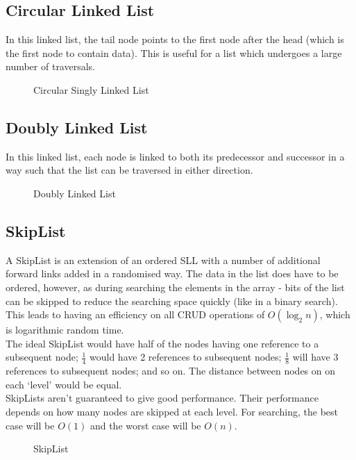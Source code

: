\subsection{Circular Linked List}
In this linked list, the tail node points to the first node after the head (which is the first node to contain data). This is useful for a list which undergoes a large number of traversals.
\begin{figure}[H]
    \centering
    
    \caption{Circular Singly Linked List}
\end{figure}

\subsection{Doubly Linked List}
In this linked list, each node is linked to both its predecessor and successor in a way such that the list can be traversed in either direction.
\begin{figure}[H]
    \centering
    
    \caption{Doubly Linked List}
\end{figure}

\subsection{SkipList}
A SkipList is an extension of an ordered SLL with a number of additional forward links added in a randomised way. The data in the list does have to be ordered, however, as during searching the elements in the array - bits of the list can be skipped to reduce the searching space quickly (like in a binary search). This leads to having an efficiency on all CRUD operations of $O(\log_2n)$, which is logarithmic random time.\\

The ideal SkipList would have half of the nodes having one reference to a subsequent node; $\frac{1}{4}$ would have 2 references to subsequent nodes; $\frac{1}{8}$ will have 3 references to subsequent nodes; and so on. The distance between nodes on on each `level' would be equal. \\

SkipLists aren't guaranteed to give good performance. Their performance depends on how many nodes are skipped at each level. For searching, the best case will be $O(1)$ and the worst case will be $O(n)$. 
\begin{figure}[H]
    \centering
    
    \caption{SkipList}
\end{figure}